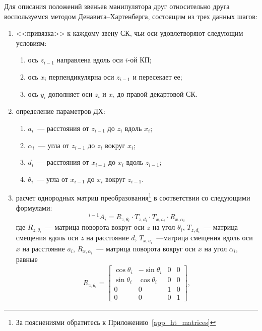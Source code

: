 Для описания положений звеньев манипулятора друг относительно друга воспользуемся методом Денавита--Хартенберга, состоящим из трех данных шагов:
\begin{enumerate}
    \item <<привязка>> к каждому звену СК, чьи оси удовлетворяют следующим условиям:
    \begin{enumerate}
	    \item ось $z_{i-1}$ направлена вдоль оси $i$-ой КП;
        \item ось $x_i$ перпендикулярна оси $z_{i-1}$ и пересекает ее;
        \item ось $y_i$ дополняет оси $z_i$ и $x_i$ до правой декартовой СК.
    \end{enumerate}
    \item определение параметров ДХ:
    \begin{enumerate}
	    \item $a_i$~--- расстояния от $z_{i-1}$ до $z_i$ вдоль $x_i$;
	    \item $\alpha_i$~--- угла от $z_{i-1}$ до $z_i$ вокруг $x_i$;
        \item $d_i$~--- расстояния от $x_{i-1}$ до $x_i$ вдоль $z_{i-1}$;
        \item $\theta_i$~--- угла от $x_{i-1}$ до $x_i$ вокруг $z_{i-1}$.
    \end{enumerate}
    \item расчет однородных матриц преобразования\footnote{За пояснениями обратитесь к Приложению~\ref{app_ht_matrices}} в соответствии со следующими формулами:
    \begin{equation}\label{DH_matrix}
        {}^{i-1}A_{i} = R_{z, \theta_i} \cdot T_{z, d_i} \cdot T_{x, a_i} \cdot R_{x, \alpha_i}
    \end{equation}
    где $R_{z, \theta_i}$~--- матрица поворота вокруг оси $z$ на угол $\theta_i$, $T_{z, d_i}$~--- матрица смещения вдоль оси $z$ на расстояние $d$, $T_{x, a_i}$~---матрица смещения вдоль оси $x$ на расстояние $a_i$,  $R_{x, \alpha_i}$~--- матрица поворота вокруг оси $x$ на угол $\alpha_i$, равные
    \begin{gather}
        R_{z, \theta_i} =
        \begin{bmatrix}
            \cos\theta_i & -\sin\theta_i & 0 & 0\\
            \sin\theta_i &  \cos\theta_i & 0 & 0\\
            0 & 0 & 1 & 0\\
            0 & 0 & 0 & 1
        \end{bmatrix}\!\!,

\end{gather}
\end{enumerate}
